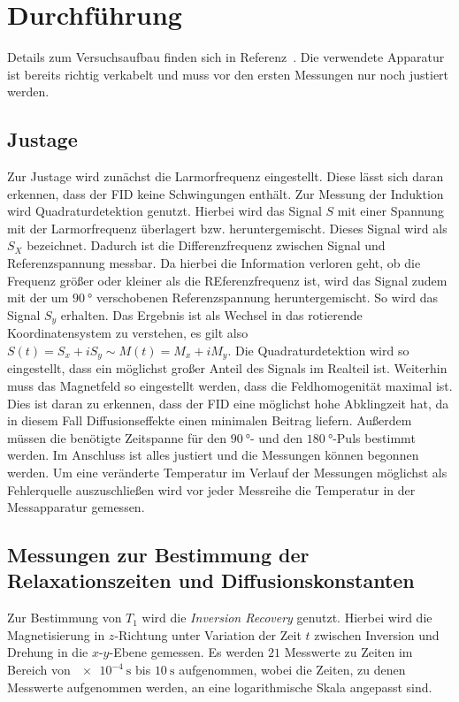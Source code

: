 \section{Durchführung}



Details zum Versuchsaufbau finden sich in Referenz~\cite{info}. Die verwendete Apparatur ist bereits richtig verkabelt und muss vor den ersten Messungen nur noch justiert werden.

\subsection{Justage}
Zur Justage wird zunächst die Larmorfrequenz eingestellt. Diese lässt sich daran erkennen, dass der FID keine Schwingungen enthält.
Zur Messung der Induktion wird Quadraturdetektion genutzt. Hierbei wird das Signal $S$ mit einer Spannung mit der Larmorfrequenz überlagert bzw. heruntergemischt. Dieses Signal wird als $S_X$ bezeichnet. Dadurch ist die Differenzfrequenz zwischen Signal und Referenzspannung messbar. Da hierbei die Information verloren geht, ob die Frequenz größer oder kleiner als die REferenzfrequenz ist, wird das Signal zudem mit der um $\SI{90}{\degree}$ verschobenen Referenzspannung heruntergemischt. So wird das Signal $S_y$ erhalten. Das Ergebnis ist als Wechsel in das rotierende Koordinatensystem zu verstehen, es gilt also $S(t) = S_x + i S_y \sim M(t) = M_x + i M_y$. Die Quadraturdetektion wird so eingestellt, dass ein möglichst großer Anteil des Signals im Realteil ist.
Weiterhin muss das Magnetfeld so eingestellt werden, dass die Feldhomogenität maximal ist. Dies ist daran zu erkennen, dass der FID eine möglichst hohe Abklingzeit hat, da in diesem Fall Diffusionseffekte einen minimalen Beitrag liefern.
Außerdem müssen die benötigte Zeitspanne für den $\SI{90}{\degree}$- und den $\SI{180}{\degree}$-Puls bestimmt werden.
Im Anschluss ist alles justiert und die Messungen können begonnen werden. Um eine veränderte Temperatur im Verlauf der Messungen möglichst als Fehlerquelle auszuschließen wird vor jeder Messreihe die Temperatur in der Messapparatur gemessen.

\subsection{Messungen zur Bestimmung der Relaxationszeiten und Diffusionskonstanten}

Zur Bestimmung von $T_1$ wird die \textit{Inversion Recovery} genutzt. Hierbei wird die Magnetisierung in $z$-Richtung unter Variation der Zeit $t$ zwischen Inversion und Drehung in die $x$-$y$-Ebene gemessen. Es werden $21$ Messwerte zu Zeiten im Bereich von $\SI{e-4}{\second}$ bis $\SI{10}{\second}$ aufgenommen, wobei die Zeiten, zu denen Messwerte aufgenommen werden, an eine logarithmische Skala angepasst sind.


